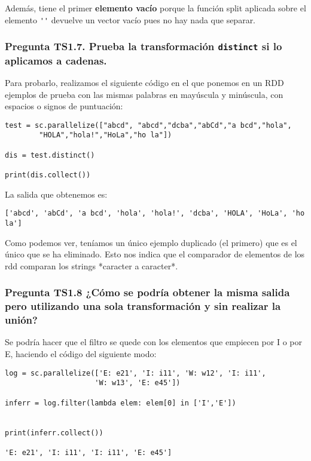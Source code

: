 \documentclass[11pt]{article}
\def\inline{\lstinline[basicstyle=\ttfamily,keywordstyle={}]}
\begin{document}
Además, tiene el primer \textbf{elemento vacío} porque la función split aplicada sobre el elemento \inline{''} devuelve un vector vacío pues no hay nada que separar.


\subsubsection*{ Pregunta TS1.7. Prueba la transformación \inline{distinct} si lo aplicamos a cadenas.}

Para probarlo, realizamos el siguiente código en el que ponemos en un RDD ejemplos de prueba con las mismas palabras en mayúscula y minúscula, con espacios o signos de puntuación:

\begin{verbatim}
test = sc.parallelize(["abcd", "abcd","dcba","abCd","a bcd","hola",
        "HOLA","hola!","HoLa","ho la"])

dis = test.distinct()

print(dis.collect())
\end{verbatim}
La salida que obtenemos es:

\begin{verbatim}
['abcd', 'abCd', 'a bcd', 'hola', 'hola!', 'dcba', 'HOLA', 'HoLa', 'ho la']
\end{verbatim}

Como podemos ver, teníamos un único ejemplo duplicado (el primero) que es el único que se ha eliminado. Esto nos indica que el comparador de elementos de los rdd comparan los strings *caracter a caracter*.

\subsubsection*{ Pregunta TS1.8 ¿Cómo se podría obtener la misma salida pero utilizando una sola transformación y sin realizar la unión?}


Se podría hacer que el filtro se quede con los elementos que empiecen por I o por E, haciendo el código del siguiente modo:

\begin{verbatim}
log = sc.parallelize(['E: e21', 'I: i11', 'W: w12', 'I: i11',
                     'W: w13', 'E: e45'])

inferr = log.filter(lambda elem: elem[0] in ['I','E'])


print(inferr.collect())

'E: e21', 'I: i11', 'I: i11', 'E: e45']

\end{verbatim}
\end{document}
